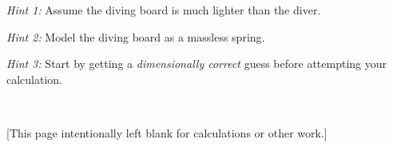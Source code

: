 \documentclass[12pt]{article}
\begin{document}
\emph{Hint 1:} Assume the diving board is much lighter than the diver.

\emph{Hint 2:} Model the diving board as a massless spring.

\emph{Hint 3:} Start by getting a \emph{dimensionally correct} guess
before attempting your calculation.

\vfill ~

\clearpage

[This page intentionally left blank for calculations or other work.]
\end{document}

